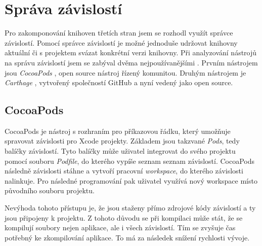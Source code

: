 \section{Správa závislostí}\label{analyza-sprava-zavislosti}

Pro zakomponování knihoven třetích stran jsem se rozhodl využít správce závislostí.
Pomocí správce závislostí je možné jednoduše udržovat knihovny aktuální či s projektem svázat konkrétní verzi knihovny.
Při analyzování nástrojů na správu závislostí jsem se zabýval dvěma nejpoužívanějšími \cite{shashikantjagtap-swift-dependency-management}.
Prvním nástrojem jsou \textit{CocoaPods} \cite{cocoapods-about}, open source nástroj řízený komunitou.
Druhým nástrojem je \textit{Carthage} \cite{github-carthage}, vytvořený společností GitHub a nyní vedený jako open source.

\subsection{CocoaPods}

CocoaPods je nástroj s rozhraním pro příkazovou řádku, který umožňuje spravovat závislosti pro Xcode projekty.
Základem jsou takzvané \textit{Pods}, tedy balíčky závislostí.
Tyto balíčky může uživatel integrovat do svého projektu pomocí souboru \textit{Podfile}, do kterého vypíše seznam seznam závislostí.
CocoaPods následně závislosti stáhne a vytvoří pracovní \textit{workspace}, do kterého závislosti nalinkuje.
Pro následné programování pak uživatel využívá nový workspace místo původního souboru projektu.

Nevýhoda tohoto přístupu je, že jsou staženy přímo zdrojové kódy závislostí a ty jsou připojeny k projektu.
Z tohoto důvodu se při kompilaci může stát, že se kompilují soubory nejen aplikace, ale i všech závislostí.
Tím se zvyšuje čas potřebný ke zkompilování aplikace.
To má za následek snížení rychlosti vývoje.
